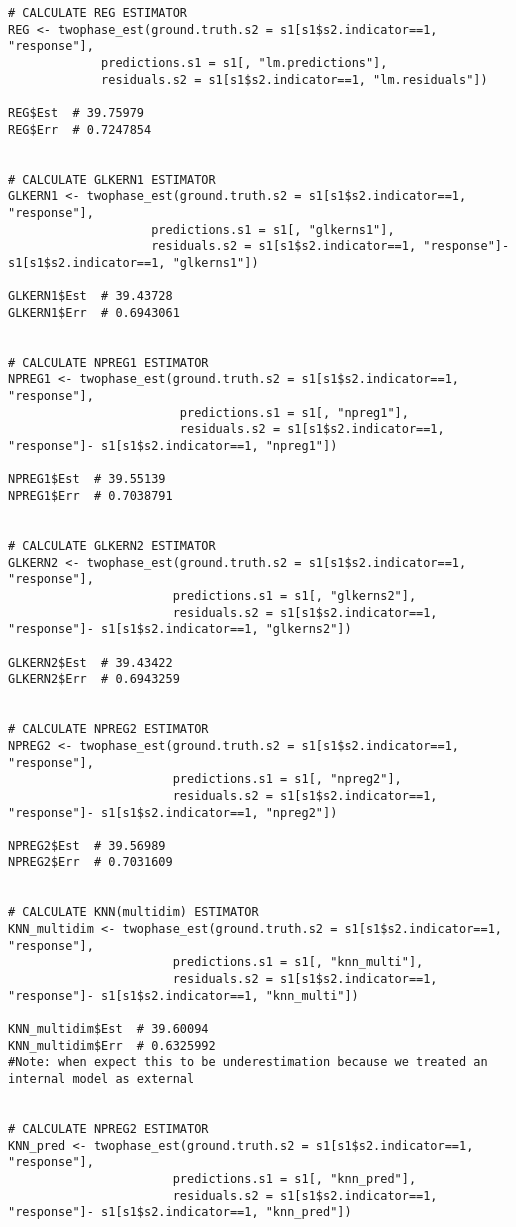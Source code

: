 \documentclass[a4paper,12pt,leqno, titlepage]{article}
\begin{document}
\begin{appendix}
{{{{\begin{verbatim}
# CALCULATE REG ESTIMATOR
REG <- twophase_est(ground.truth.s2 = s1[s1$s2.indicator==1, "response"],
             predictions.s1 = s1[, "lm.predictions"],
             residuals.s2 = s1[s1$s2.indicator==1, "lm.residuals"])

REG$Est  # 39.75979
REG$Err  # 0.7247854


# CALCULATE GLKERN1 ESTIMATOR
GLKERN1 <- twophase_est(ground.truth.s2 = s1[s1$s2.indicator==1, "response"],
                    predictions.s1 = s1[, "glkerns1"],
                    residuals.s2 = s1[s1$s2.indicator==1, "response"]- s1[s1$s2.indicator==1, "glkerns1"])

GLKERN1$Est  # 39.43728
GLKERN1$Err  # 0.6943061


# CALCULATE NPREG1 ESTIMATOR
NPREG1 <- twophase_est(ground.truth.s2 = s1[s1$s2.indicator==1, "response"],
                        predictions.s1 = s1[, "npreg1"],
                        residuals.s2 = s1[s1$s2.indicator==1, "response"]- s1[s1$s2.indicator==1, "npreg1"])

NPREG1$Est  # 39.55139
NPREG1$Err  # 0.7038791


# CALCULATE GLKERN2 ESTIMATOR
GLKERN2 <- twophase_est(ground.truth.s2 = s1[s1$s2.indicator==1, "response"],
                       predictions.s1 = s1[, "glkerns2"],
                       residuals.s2 = s1[s1$s2.indicator==1, "response"]- s1[s1$s2.indicator==1, "glkerns2"])

GLKERN2$Est  # 39.43422
GLKERN2$Err  # 0.6943259


# CALCULATE NPREG2 ESTIMATOR
NPREG2 <- twophase_est(ground.truth.s2 = s1[s1$s2.indicator==1, "response"],
                       predictions.s1 = s1[, "npreg2"],
                       residuals.s2 = s1[s1$s2.indicator==1, "response"]- s1[s1$s2.indicator==1, "npreg2"])

NPREG2$Est  # 39.56989
NPREG2$Err  # 0.7031609


# CALCULATE KNN(multidim) ESTIMATOR
KNN_multidim <- twophase_est(ground.truth.s2 = s1[s1$s2.indicator==1, "response"],
                       predictions.s1 = s1[, "knn_multi"],
                       residuals.s2 = s1[s1$s2.indicator==1, "response"]- s1[s1$s2.indicator==1, "knn_multi"])

KNN_multidim$Est  # 39.60094
KNN_multidim$Err  # 0.6325992
#Note: when expect this to be underestimation because we treated an internal model as external


# CALCULATE NPREG2 ESTIMATOR
KNN_pred <- twophase_est(ground.truth.s2 = s1[s1$s2.indicator==1, "response"],
                       predictions.s1 = s1[, "knn_pred"],
                       residuals.s2 = s1[s1$s2.indicator==1, "response"]- s1[s1$s2.indicator==1, "knn_pred"])


\end{verbatim}}}}}
\end{appendix}
\end{document}
